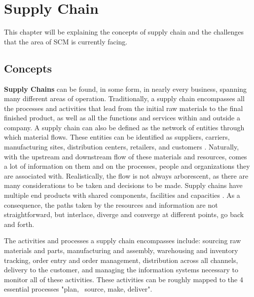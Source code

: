 \chapter{Supply Chain}
\label{chap:supply-chain-problems}

\minitoc \mtcskip \noindent

This chapter will be explaining the concepts of supply chain and the challenges that the area of SCM is currently facing.

\section{Concepts}
\textbf{Supply Chains} can be found, in some form, in nearly every business, spanning many different areas of operation. Traditionally, a supply chain encompasses all the processes and activities that lead from the initial raw materials to the final finished product, as well as all the functions and services within and outside a company. A supply chain can also be defined as the network of entities through which material flows. These entities can be identified as suppliers, carriers, manufacturing sites, distribution centers, retailers, and customers \cite{Lummus2014}. Naturally, with the upstream and downstream flow of these materials and resources, comes a lot of information on them and on the processes, people and organizations they are associated with. Realistically, the  flow is not always arborescent, as there are many considerations to be taken and decisions to be made. Supply chains have multiple end products with shared components, facilities and capacities \cite{Ganeshan1995}. As a consequence, the paths taken by the resources and information are not straightforward, but interlace, diverge and converge at different points, go back and forth.
  
  
  The activities and processes a supply chain encompasses include: sourcing raw materials and parts, manufacturing and assembly, warehousing and inventory tracking, order entry and order management, distribution across all channels, delivery to the customer, and managing the information systems necessary to monitor all of these activities. These activities can be roughly mapped to the 4 essential processes "plan,~ source, make, deliver". \cite{Lummus2014}
  
  
